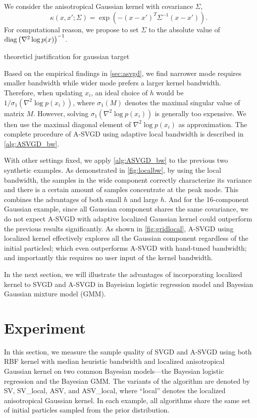 We consider the anisotropical Gaussian kernel with covariance $\Sigma$,
\[
\kappa(x, x'; \Sigma) = \exp(-(x - x')^T \Sigma^{-1}(x- x')  ).  
\]
For computational reason, we propose to set $\Sigma $ to the absolute value of $\operatorname{diag} \left(\nabla^2 \log p(x) \right)^{-1}$.

\bnprop
theoreticl justification for gaussian target
\enprop


Based on the empirical findings in \cref{sec:asvgd}, we find narrower mode
requires smaller bandwidth while wider mode prefers a larger kernel
bandwidth.
Therefore, when updating $x_i$, an ideal choice of $h$ would be $1/
\sigma_1(\nabla^2 \log p(x_i))$, where $\sigma_1(M)$ denotes the maximal
singular value of matrix $M$. However, solving $\sigma_1(\nabla^2 \log
p(x_i))$ is generally too expensive. We then use the maximal diagonal element
of $\nabla^2 \log p(x_i)$ as approximation. The complete procedure of A-SVGD
using adaptive local bandwidth is described in \cref{alg:ASVGD_bw}.

With other settings fixed, we apply \cref{alg:ASVGD_bw} to the previous two
synthetic examples. As demonstrated in \cref{fig:localbw}, by using the local
bandwidth, the samples in the wide component correctly characterize its
variance and there is a certain amount of samples concentrate at the peak
mode. This combines the advantages of both small $h$ and large $h$. And for
the 16-component Gaussian example, since all Gaussian component shares the
same covariance, we do not expect A-SVGD with adaptive localized Gaussian
kernel could outperform the previous results significantly. As shown in
\cref{fig:gridlocal}, A-SVGD using localized kernel effectively explores all
the Gaussian component regardless of the initial particlesl; which even
outperforms A-SVGD with hand-tuned bandwidth; and importantly this requires
no user input of the kernel bandwidth.


In the next section, we will illustrate the advantages of incorporating
localized kernel to SVGD and A-SVGD in Bayeisian logistic regression model
and Bayesian Gaussian mixture model (GMM).


\section{Experiment} \label{sec:expt}

In this section, we measure the sample quality of SVGD and A-SVGD using both
RBF kernel with median heuristic bandwidth and localized anisotropical
Gaussian kernel on two common Bayesian models---the Bayesian logistic
regression and the Bayesian GMM. The variants of the algorithm are denoted by
SV, SV\_local, ASV, and ASV\_local, where ``local'' denotes the localized
anisotropical Gaussian kernel. In each example, all algorithms share the same
set of initial particles sampled from the prior distribution.


